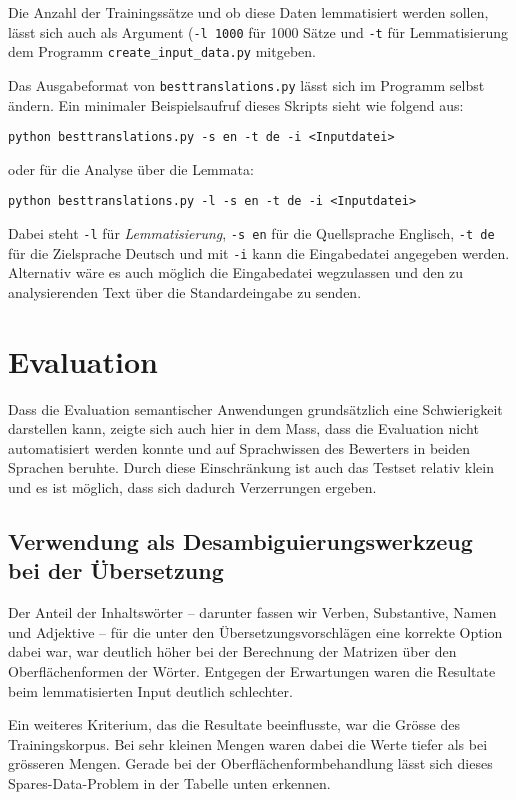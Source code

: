 \documentclass[11pt,twoside,openright]{mpreport}
\begin{document}
Die Anzahl der Trainingssätze und ob diese Daten lemmatisiert werden sollen, lässt sich auch als Argument (\verb+-l 1000+ für 1000 Sätze und \verb+-t+ für Lemmatisierung dem Programm \verb+create_input_data.py+ mitgeben.

Das Ausgabeformat von \verb+besttranslations.py+ lässt sich im Programm selbst ändern. Ein minimaler Beispielsaufruf dieses Skripts sieht wie folgend aus:

\verb+python besttranslations.py -s en -t de -i <Inputdatei>+

oder für die Analyse über die Lemmata:

\verb+python besttranslations.py -l -s en -t de -i <Inputdatei>+

Dabei steht \verb+-l+ für \emph{Lemmatisierung}, \verb+-s en+ für die Quellsprache Englisch, \verb+-t de+ für die Zielsprache Deutsch und mit \verb+-i+ kann die Eingabedatei angegeben werden. Alternativ wäre es auch möglich die Eingabedatei wegzulassen und den zu analysierenden Text über die Standardeingabe zu senden.


\chapter{Evaluation}
\label{cha:evaluation}

Dass die Evaluation semantischer Anwendungen grundsätzlich eine Schwierigkeit darstellen kann, zeigte sich auch hier in dem Mass, dass die Evaluation nicht automatisiert werden konnte und auf Sprachwissen des Bewerters in beiden Sprachen beruhte. Durch diese Einschränkung ist auch das Testset relativ klein und es ist möglich, dass sich dadurch Verzerrungen ergeben.

\section{Verwendung als Desambiguierungswerkzeug bei der Übersetzung}

Der Anteil der Inhaltswörter -- darunter fassen wir Verben, Substantive, Namen und Adjektive -- für die unter den Übersetzungsvorschlägen eine korrekte Option dabei war, war deutlich höher bei der Berechnung der Matrizen über den Oberflächenformen der Wörter. Entgegen der Erwartungen waren die Resultate beim lemmatisierten Input deutlich schlechter.

Ein weiteres Kriterium, das die Resultate beeinflusste, war die Grösse des Trainingskorpus. Bei sehr kleinen Mengen waren dabei die Werte tiefer als bei grösseren Mengen. Gerade bei der Oberflächenformbehandlung lässt sich dieses Spares-Data-Problem in der Tabelle unten erkennen.
\end{document}
